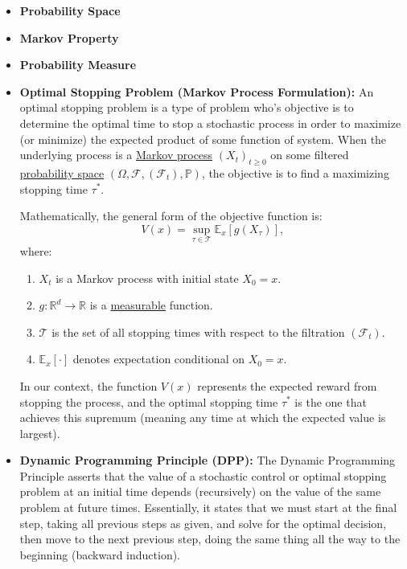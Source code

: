 \documentclass[titlepage]{article}
\begin{document}
\begin{itemize}
    \item \textbf{Probability Space} \label{sec:probability space}
    
    \item \textbf{Markov Property} \label{sec:markov property}

    \item \textbf{Probability Measure} \label{sec:measure}
    
        
    \item \textbf{Optimal Stopping Problem (Markov Process Formulation):} \label{sec:Optimal Stopping Problem}An optimal stopping problem is a type of problem who's objective is to determine the optimal time to stop a stochastic process in order to maximize (or minimize) the expected product of some function of system. When the underlying process is a \hyperref[sec:markov property]{Markov process} $(X_t)_{t \geq 0}$ on some filtered \hyperref[sec:probability space]{probability space} $(\Omega, \mathcal{F}, (\mathcal{F}_t), \mathbb{P})$, the objective is to find a maximizing stopping time $\tau^*$.

    Mathematically, the general form of the objective function is:
    \[
    V(x) = \sup_{\tau \in \mathcal{T}} \mathbb{E}_x \left[ g(X_\tau) \right],
    \]
    where:
    \begin{enumerate}
        \item $X_t$ is a Markov process with initial state $X_0 = x$.
        \item $g: \mathbb{R}^d \to \mathbb{R}$ is a \hyperref[sec:measure]{measurable} function.
        \item $\mathcal{T}$ is the set of all stopping times with respect to the filtration $(\mathcal{F}_t)$.
        \item $\mathbb{E}_x[\cdot]$ denotes expectation conditional on $X_0 = x$.
    \end{enumerate}
    
    In our context, the function $V(x)$ represents the expected reward from stopping the process, and the optimal stopping time $\tau^*$ is the one that achieves this supremum (meaning any time at which the expected value is largest).
    
    \item \textbf{Dynamic Programming Principle (DPP):} \label{sec:DPP} The Dynamic Programming Principle asserts that the value of a stochastic control or optimal stopping problem at an initial time depends (recursively) on the value of the same problem at future times. Essentially, it states that we must start at the final step, taking all previous steps as given, and solve for the optimal decision, then move to the next previous step, doing the same thing all the way to the beginning (backward induction).


\end{itemize}
\end{document}
